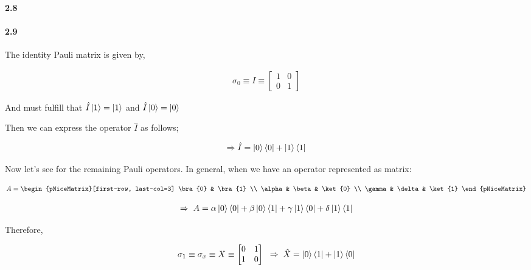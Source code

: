 
\paragraph{2.8} %



\paragraph{2.9} %

The identity Pauli matrix is given by,

\begin{align}
  \label{eq:2.9.1}
  \sigma_0 \equiv I \equiv
  \begin{bmatrix}
    1 & 0 \\
    0 & 1
  \end{bmatrix}
\end{align}

And must fulfill that $\hat{I}\ket{1} = \ket{1}$ and $\hat{I}\ket{0} = \ket{0}$

Then we can express the operator $\hat{I}$ as follows;

\begin{align}
  \label{eq:2.9.2}
  \Rightarrow\hat{I}=\ket{0}\bra{0}+\ket{1}\bra{1}
\end{align}

Now let's see for the remaining Pauli operators. In general, when we have an operator represented as matrix:

\begin{align}
  \label{eq:2.9.3}
  A =
  \begin{pNiceMatrix}[first-row, last-col=3]
    \bra{0} & \bra{1}          \\
    \alpha  & \beta  & \ket{0} \\
    \gamma  & \delta & \ket{1}
  \end{pNiceMatrix}
\end{align}

\begin{align}
  \label{eq:2.9.4}
  \Rightarrow \; A = \alpha\ket{0}\bra{0}+\beta\ket{0}\bra{1}+\gamma\ket{1}\bra{0}+\delta\ket{1}\bra{1}
\end{align}

Therefore,

\begin{align}
  \label{eq:2.9.5}
  \sigma_1 \equiv \sigma_x \equiv X \equiv
  \begin{bmatrix}
    0 & 1 \\
    1 & 0
  \end{bmatrix}
  \; \; \Rightarrow \; \hat{X}=\ket{0}\bra{1}+\ket{1}\bra{0}
\end{align}

